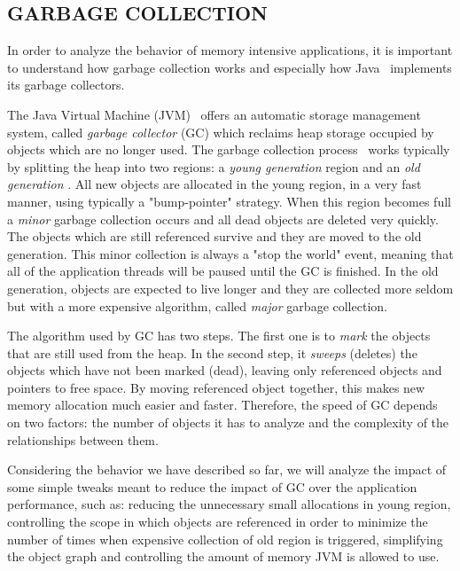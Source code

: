 \documentclass[a4paper,twoside]{article}
\begin{document}
\subsection{\uppercase{Garbage Collection}}\label{subsec:uppercase14}

In order to analyze the behavior of memory intensive applications,
it is important to understand how garbage collection works and especially how Java~\cite{java} implements its garbage collectors.

The Java Virtual Machine (JVM)~\cite{lindholm:2014} offers an automatic storage management system, called {\textit{garbage collector}  (GC)} which reclaims heap storage occupied by objects which are no longer used.
The garbage collection process~\cite{gc:oracle} works typically by splitting the heap into two regions: a {\textit{young generation} } region and an {\textit{old generation} }.
All new objects are allocated in the young region, in a very fast manner, using typically a "bump-pointer" strategy.
When this region becomes full  a {\textit{minor} } garbage collection occurs and all dead objects are deleted very quickly.
The objects which are still referenced survive and they  are moved to the old generation.
This minor collection is always a "stop the world" event, meaning that all of the application threads will be paused until the GC is finished.
In the old generation, objects are expected to live longer and they are collected more seldom but with a more expensive algorithm, called {\textit{major} } garbage collection.

The algorithm used by GC has two steps.
The first one is to {\textit{mark} } the objects that are still used from the heap.
In the second step, it {\textit{sweeps}  (deletes)} the objects which have not been marked (dead), leaving only referenced objects and pointers to free space.
By moving referenced object together, this makes new memory allocation much easier and faster.
Therefore, the speed of GC depends on two factors: the number of objects it has to analyze and the complexity of the relationships between them. %

Considering the behavior we have described so far, we will analyze the impact of some simple tweaks
meant to reduce the impact of GC over the application performance, such as:
reducing the unnecessary small allocations in young region, controlling the scope in which objects are referenced in order to minimize the number of times when expensive collection of old region is triggered, simplifying the object graph and controlling the amount of memory JVM is allowed to use.
\end{document}
